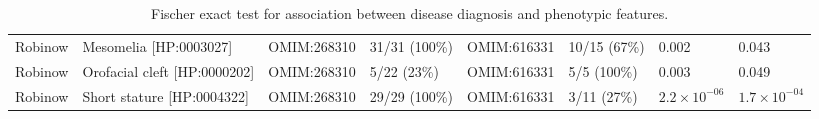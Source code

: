 \begin{fontsize}
\begin{table}
\begin{tabular}{l>{\raggedright}p{2.5cm}llllll}
Robinow & Mesomelia [HP:0003027] & OMIM:268310 & 31/31 (100\%) & OMIM:616331 & 10/15 (67\%) & 0.002 & 0.043\\
Robinow & Orofacial cleft [HP:0000202] & OMIM:268310 & 5/22 (23\%) & OMIM:616331 & 5/5 (100\%) & 0.003 & 0.049\\
Robinow & Short stature [HP:0004322] & OMIM:268310 & 29/29 (100\%) & OMIM:616331 & 3/11 (27\%) & $2.2 \times 10^{-06}$ & $1.7 \times 10^{-04}$\\
\bottomrule
\end{tabular}
\caption{Fischer exact test for association between disease diagnosis and phenotypic features.}
\label{tab:to_do}
\end{table}
\end{fontsize}